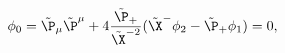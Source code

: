 \begin{equation}
\phi_0=\tilde\P_\mu\tilde\P^\mu+
4\frac{\tilde\P_+}{\tilde\X^{-2}}(\tilde\X^-\phi_2-
\tilde\P_+\phi_1)=0,
\label{tphi0}
\end{equation}

